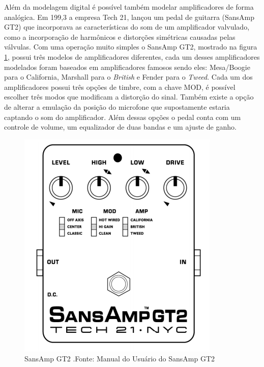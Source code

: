 Além da modelagem digital é possível também modelar amplificadores de forma analógica. Em 199,3 a empresa Tech 21, lançou um pedal de guitarra (SansAmp GT2) que incorporava as características do som de um amplificador valvulado, como a incorporação de harmônicos e distorções simétricas causadas pelas válvulas. Com uma operação muito simples o SansAmp GT2, mostrado na figura \ref{fig:sansamp}, possui três modelos de amplificadores diferentes, cada um desses amplificadores modelados foram baseados em amplificadores famosos sendo eles: Mesa/Boogie para o California, Marshall para o \textit{British} e Fender para o \textit{Tweed}. Cada um dos amplificadores possui três opções de timbre, com a chave MOD, é possível escolher três modos que modificam a distorção do sinal. Também existe a opção de alterar a emulação da posição do microfone que supostamente estaria captando o som do amplificador. Além dessas opções o pedal conta com um controle de volume, um equalizador de duas bandas e um ajuste de ganho.
\begin{figure}[!htb]
	\centering
	\includegraphics[width=0.7\linewidth]{figuras/SanSamp}
	\caption{SansAmp GT2 .Fonte: Manual do Usuário do SansAmp GT2}
	\label{fig:sansamp}
\end{figure}



